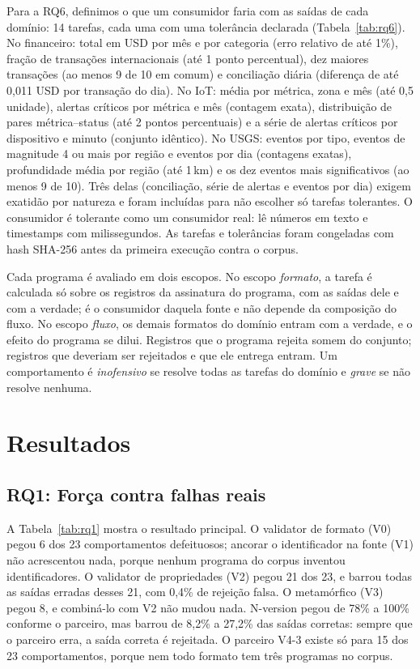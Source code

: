 \documentclass[sigconf,nonacm]{acmart}
\begin{document}
Para a RQ6, definimos o que um consumidor faria com as saídas de cada domínio: 14 tarefas, cada uma com uma tolerância declarada (Tabela~\ref{tab:rq6}). No financeiro: total em USD por mês e por categoria (erro relativo de até 1\%), fração de transações internacionais (até 1 ponto percentual), dez maiores transações (ao menos 9 de 10 em comum) e conciliação diária (diferença de até 0{,}011 USD por transação do dia). No IoT: média por métrica, zona e mês (até 0{,}5 unidade), alertas críticos por métrica e mês (contagem exata), distribuição de pares métrica--status (até 2 pontos percentuais) e a série de alertas críticos por dispositivo e minuto (conjunto idêntico). No USGS: eventos por tipo, eventos de magnitude 4 ou mais por região e eventos por dia (contagens exatas), profundidade média por região (até 1\,km) e os dez eventos mais significativos (ao menos 9 de 10). Três delas (conciliação, série de alertas e eventos por dia) exigem exatidão por natureza e foram incluídas para não escolher só tarefas tolerantes. O consumidor é tolerante como um consumidor real: lê números em texto e timestamps com milissegundos. As tarefas e tolerâncias foram congeladas com hash SHA-256 antes da primeira execução contra o corpus.

Cada programa é avaliado em dois escopos. No escopo \textit{formato}, a tarefa é calculada só sobre os registros da assinatura do programa, com as saídas dele e com a verdade; é o consumidor daquela fonte e não depende da composição do fluxo. No escopo \textit{fluxo}, os demais formatos do domínio entram com a verdade, e o efeito do programa se dilui. Registros que o programa rejeita somem do conjunto; registros que deveriam ser rejeitados e que ele entrega entram. Um comportamento é \textit{inofensivo} se resolve todas as tarefas do domínio e \textit{grave} se não resolve nenhuma.

\section{Resultados}

\subsection{RQ1: Força contra falhas reais}
\label{sec:rq1}

A Tabela~\ref{tab:rq1} mostra o resultado principal. O validator de formato (V0) pegou 6 dos 23 comportamentos defeituosos; ancorar o identificador na fonte (V1) não acrescentou nada, porque nenhum programa do corpus inventou identificadores. O validator de propriedades (V2) pegou 21 dos 23, e barrou todas as saídas erradas desses 21, com 0,4\% de rejeição falsa. O metamórfico (V3) pegou 8, e combiná-lo com V2 não mudou nada. N-version pegou de 78\% a 100\% conforme o parceiro, mas barrou de 8,2\% a 27,2\% das saídas corretas: sempre que o parceiro erra, a saída correta é rejeitada. O parceiro V4-3 existe só para 15 dos 23 comportamentos, porque nem todo formato tem três programas no corpus.
\end{document}
